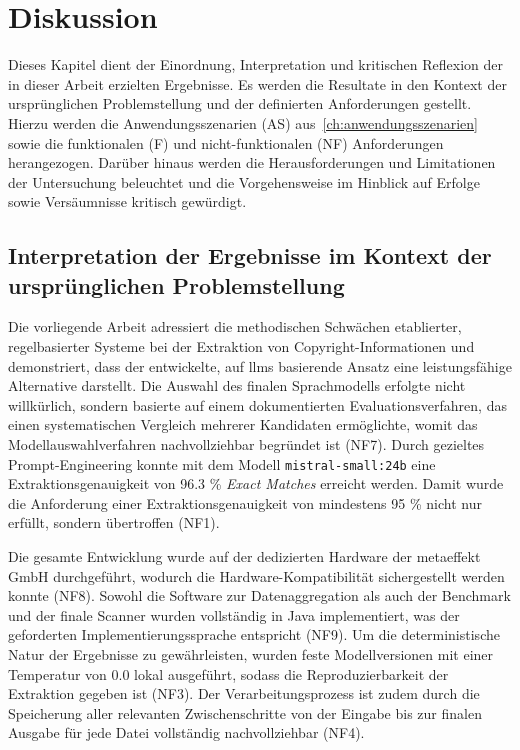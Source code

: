 \chapter{Diskussion}\label{ch:diskussion}

Dieses Kapitel dient der Einordnung, Interpretation und kritischen Reflexion der in dieser Arbeit erzielten Ergebnisse.
Es werden die Resultate in den Kontext der ursprünglichen Problemstellung und der definierten Anforderungen gestellt.
Hierzu werden die Anwendungsszenarien (AS) aus~\ref{ch:anwendungsszenarien} sowie die funktionalen (F) und nicht-funktionalen (NF) Anforderungen herangezogen.
Darüber hinaus werden die Herausforderungen und Limitationen der Untersuchung beleuchtet und die Vorgehensweise im Hinblick auf Erfolge sowie Versäumnisse kritisch gewürdigt.


\section{Interpretation der Ergebnisse im Kontext der ursprünglichen Problemstellung}

Die vorliegende Arbeit adressiert die methodischen Schwächen etablierter, regelbasierter Systeme bei der Extraktion von Copyright-Informationen und demonstriert, dass der entwickelte, auf \glspl{llm} basierende Ansatz eine leistungsfähige Alternative darstellt.
Die Auswahl des finalen Sprachmodells erfolgte nicht willkürlich, sondern basierte auf einem dokumentierten Evaluationsverfahren, das einen systematischen Vergleich mehrerer Kandidaten ermöglichte, womit das Modellauswahlverfahren nachvollziehbar begründet ist (NF7).
Durch gezieltes Prompt-Engineering konnte mit dem Modell \texttt{mistral-small:24b} eine Extraktionsgenauigkeit von \num{96,3} \% \textit{Exact Matches} erreicht werden.
Damit wurde die Anforderung einer Extraktionsgenauigkeit von mindestens \num{95} \% nicht nur erfüllt, sondern übertroffen (NF1).

Die gesamte Entwicklung wurde auf der dedizierten Hardware der metaeffekt GmbH durchgeführt, wodurch die Hardware-Kompatibilität sichergestellt werden konnte (NF8).
Sowohl die Software zur Datenaggregation als auch der Benchmark und der finale Scanner wurden vollständig in Java implementiert, was der geforderten Implementierungssprache entspricht (NF9).
Um die deterministische Natur der Ergebnisse zu gewährleisten, wurden feste Modellversionen mit einer Temperatur von \num{0.0} lokal ausgeführt, sodass die Reproduzierbarkeit der Extraktion gegeben ist (NF3).
Der Verarbeitungsprozess ist zudem durch die Speicherung aller relevanten Zwischenschritte von der Eingabe bis zur finalen Ausgabe für jede Datei vollständig nachvollziehbar (NF4).

